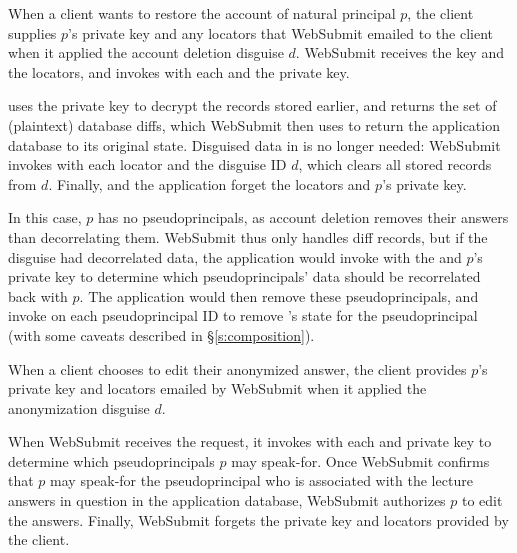 %
When a client wants to restore the account of natural principal $p$, the client
supplies $p$'s private key and any locators  that WebSubmit emailed to
the client when it applied the account deletion disguise $d$.
%
WebSubmit receives the key and the locators, and invokes  with
each  and the private key.
%

\sys uses the private key to decrypt the records stored earlier, and returns the
set of (plaintext) database diffs, which WebSubmit then uses to return the
application database to its original state.
%
Disguised data in \sys is no longer needed: WebSubmit invokes  with
each locator and the disguise ID $d$, which clears all stored records from $d$.
%
Finally, \sys and the application forget the locators and $p$'s private key.
%

%
In this case, $p$ has no pseudoprincipals, as account deletion removes their
answers than decorrelating them.
%
WebSubmit thus only handles diff records, but if the disguise had decorrelated
data, the application would invoke  with the 
and $p$'s private key to determine which pseudoprincipals' data should be
recorrelated back with $p$.
%
The application would then remove these pseudoprincipals, and invoke
 on each pseudoprincipal ID to remove \sys's state for the
pseudoprincipal (with some caveats described in \S\ref{s:composition}).

%
When a client chooses to edit their anonymized answer, the client provides $p$'s
private key and locators  emailed by WebSubmit when it applied
the anonymization disguise $d$.

When WebSubmit receives the request, it invokes  with each
 and private key to determine which pseudoprincipals $p$ may speak-for.
%
Once WebSubmit confirms that $p$ may speak-for the pseudoprincipal who is
associated with the lecture answers in question in the application database,
WebSubmit authorizes $p$ to edit the answers.
%
Finally, WebSubmit forgets the private key and locators provided by the client.
%

